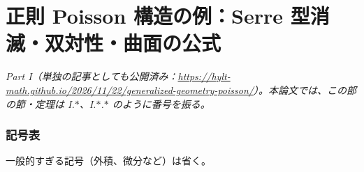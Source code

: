 \part{正則 Poisson 構造の例：Serre 型消滅・双対性・曲面の公式}
\setcounter{section}{0}
\noindent\textit{Part I（単独の記事としても公開済み：\url{https://hylt-math.github.io/2026/11/22/generalized-geometry-poisson/}）。本論文では、この部の節・定理は I.$\ast$、I.$\ast$.$\ast$ のように番号を振る。}\par
\section{記号表}\label{p1:sec:notation}
一般的すぎる記号（外積、微分など）は省く。

